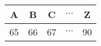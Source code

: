 \begin{tabular}{|c|c|c|c|c|}
\hline
A & B & C & $\cdots$ & Z \\
\hline
65 & 66 & 67 & $\cdots$ & 90 \\
\hline
\end{tabular}
